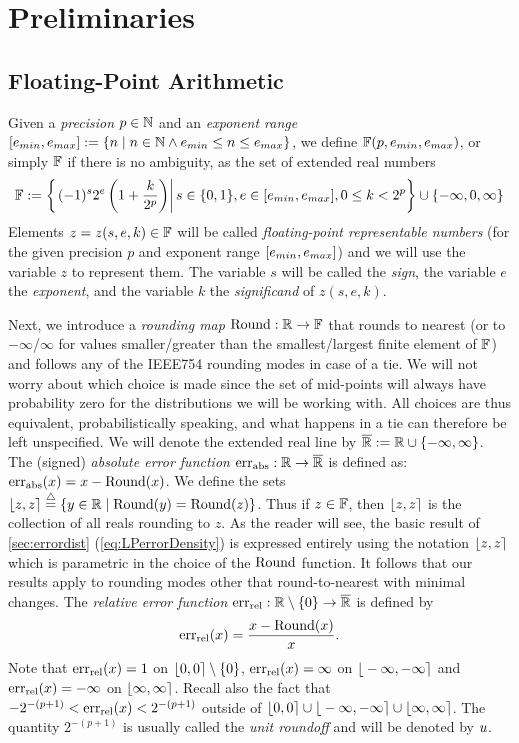 \section{Preliminaries}\label{sec:preliminaries}

\subsection{Floating-Point Arithmetic}\label{subsec:fparith}

Given a \emph{precision} $p\in\mathbb{N}$ and an \emph{exponent range} $[e_{min},e_{max}]\mathrel{:=} \{ n \mid n \in \mathbb{N} \wedge e_{min} \leq n \leq e_{max} \}$, we define $\mathbb{F}(p,e_{min},e_{max})$, or simply $\mathbb{F}$ if there is no ambiguity, as the set of extended real numbers
\begin{align*}
\mathbb{F}\mathrel{:=}\left\{\left.(-1)^s 2^e\left(1+\frac{k}{2^p}\right)\right\rvert s\in\{0,1\}, e\in [e_{min},e_{max}], 0\leq k<2^p\right\}\cup\{-\infty,0,\infty\}
\end{align*}
Elements $z=z(s,e,k)\in \mathbb{F}$ will be called \emph{floating-point representable numbers} (for the given precision $p$ and exponent range $[e_{min},e_{max}]$) and we will use the variable $z$ to represent them. The variable $s$ will be called the \emph{sign}, the variable $e$ the \emph{exponent}, and the variable $k$ the \emph{significand} of $z(s,e,k)$.
  
Next, we introduce a \emph{rounding map} $\mathrm{Round}:\mathbb{R}\to\mathbb{F}$ that rounds to nearest (or to $-\infty$/$\infty$ for values smaller/greater than the smallest/largest finite element of $\mathbb{F}$) and follows any of the IEEE754 rounding modes in case of a tie. We will not worry about which choice is made since the set of mid-points will always have probability zero for the  distributions we will be working with. All choices are thus equivalent, probabilistically speaking, and what happens in a tie can therefore be left unspecified.  We will denote the extended real line by $\overline{\mathbb{R}}\mathrel{:=} \mathbb{R}\cup\{-\infty,\infty\}$. The (signed) \emph{absolute error function} $\mathrm{err}_{\mathrm{abs}}:\mathbb{R}\to\overline{\mathbb{R}}$ is defined as:
$\mathrm{err}_{\mathrm{abs}}(x)=x-\mathrm{Round}(x)$.
We define the sets $\fintvl\stackrel{\triangle}{=}\left\{y\in\R\mid \round(y)=\round(z)\right\}$.   
Thus if $z\in \mathbb{F}$, then $\fintvl[z]$ is the collection of all reals rounding to $z$.  As the reader will see, the basic result of \cref{sec:errordist} (\cref{eq:LPerrorDensity}) is expressed entirely using the notation $\fintvl[z]$ which is parametric in the choice of the $\mathrm{Round}$ function.  It follows that our results apply to rounding modes other that round-to-nearest with minimal changes.  The \emph{relative error function} $\mathrm{err}_{\mathrm{rel}}:\mathbb{R}\setminus\{0\}\to\overline{\mathbb{R}}$ is defined by
\[
\mathrm{err}_{\mathrm{rel}}(x)=\frac{x-\mathrm{Round}(x)}{x}.
\]
Note that $\mathrm{err}_{\mathrm{rel}}(x)=1$ on $\fintvl[0]\setminus\{0\}$, $\mathrm{err}_{\mathrm{rel}}(x)=\infty$ on $\fintvl[-\infty]$ and $\mathrm{err}_{\mathrm{rel}}(x)=-\infty$ on $\fintvl[\infty]$.
Recall also the fact \cite{higham2002accuracy} that $-2^{-(p+1)}<\mathrm{err}_{\mathrm{rel}}(x)<2^{-(p+1)}$ outside of $\fintvl[0]\cup\fintvl[-\infty]\cup\fintvl[\infty]$. The quantity $2^{-(p+1)}$ is usually called the \emph{unit roundoff} and will be denoted by $u$. 

